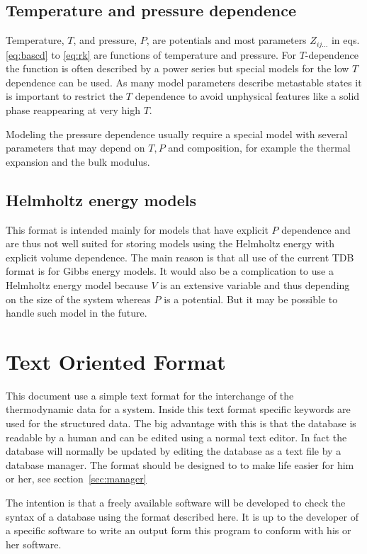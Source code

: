 \documentclass[12pt]{article}
\begin{document}
\subsection{Temperature and pressure dependence}

Temperature, $T$, and pressure, $P$, are potentials and most
parameters $Z_{ij...}$ in eqs.  \ref{eq:bascd} to \ref{eq:rk} are
functions of temperature and pressure.  For $T$-dependence the
function is often described by a power series but special models for
the low $T$ dependence can be used.  As many model parameters describe
metastable states it is important to restrict the $T$ dependence to
avoid unphysical features like a solid phase reappearing at very high
$T$.

Modeling the pressure dependence usually require a special model with
several parameters that may depend on $T, P$ and composition, for
example the thermal expansion and the bulk modulus.

\subsection{Helmholtz energy models}

This format is intended mainly for models that have explicit $P$
dependence and are thus not well suited for storing models using the
Helmholtz energy with explicit volume dependence.  The main reason is
that all use of the current TDB format is for Gibbs energy models.  It
would also be a complication to use a Helmholtz energy model because
$V$ is an extensive variable and thus depending on the size of the
system whereas $P$ is a potential.  But it may be possible to handle
such model in the future.

\section{Text Oriented Format}

This document use a simple text format for the interchange of the
thermodynamic data for a system.  Inside this text format specific
keywords are used for the structured data.  The big advantage with
this is that the database is readable by a human and can be edited
using a normal text editor.  In fact the database will normally be
updated by editing the database as a text file by a database manager.
The format should be designed to to make life easier for him or her,
see section~\ref{sec:manager}

The intention is that a freely available software will be developed to
check the syntax of a database using the format described here.  It is
up to the developer of a specific software to write an output form
this program to conform with his or her software.
\end{document}
